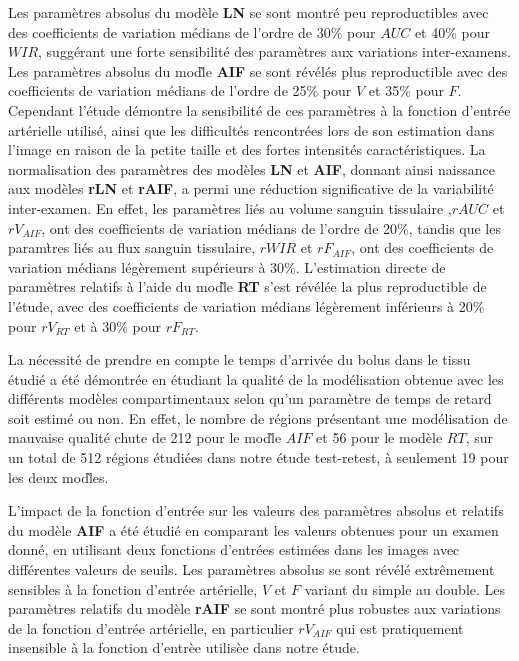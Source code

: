 \begin{otherlanguage}{francais}
Les param\`etres absolus du mod\`ele \textbf{LN} se sont montr\'e peu reproductibles avec des coefficients de variation m\'edians de l'ordre de 30\% pour $AUC$ et 40\% pour $WIR$, sugg\'erant une forte sensibilit\'e des param\`etres aux variations inter-examens.
Les param\`etres absolus du mod\`le \textbf{AIF} se sont r\'ev\'el\'es plus reproductible avec des coefficients de variation m\'edians de l'ordre de 25\% pour $V$ et 35\% pour $F$.
Cependant l'\'etude d\'emontre la sensibilit\'e de ces param\`etres \`a la fonction d'entr\'ee art\'erielle utilis\'e, ainsi que les difficult\'es rencontr\'ees lors de son estimation dans l'image en raison de la petite taille et des fortes intensit\'es caract\'eristiques.
La normalisation des param\`etres des mod\`eles \textbf{LN} et \textbf{AIF}, donnant ainsi naissance aux mod\`eles \textbf{rLN} et \textbf{rAIF}, a permi une r\'eduction significative de la variabilit\'e inter-examen.
En effet, les param\`etres li\'es au volume sanguin tissulaire ,$rAUC$ et $rV_{AIF}$, ont des coefficients de variation m\'edians de l'ordre de 20\%, tandis que les param\`tres li\'es au flux sanguin tissulaire, $rWIR$ et $rF_{AIF}$, ont des coefficients de variation m\'edians l\'eg\`erement sup\'erieurs \`a 30\%.
L'estimation directe de param\`etres relatifs \`a l'aide du mod\`le \textbf{RT} s'est r\'ev\'el\'ee la plus reproductible de l'\'etude, avec des coefficients de variation m\'edians l\'eg\`erement inf\'erieurs \`a 20\% pour $rV_{RT}$ et \`a 30\% pour $rF_{RT}$.

La n\'ecessit\'e de prendre en compte le temps d'arriv\'ee du bolus dans le tissu \'etudi\'e a \'et\'e d\'emontr\'ee en \'etudiant la qualit\'e de la mod\'elisation obtenue avec les diff\'erents mod\`eles compartimentaux selon qu'un param\`etre de temps de retard soit estim\'e ou non. 
En effet, le nombre de r\'egions pr\'esentant une mod\'elisation de mauvaise qualit\'e chute de 212 pour le mod\`le $AIF$ et 56 pour le mod\`ele $RT$, sur un total de 512 r\'egions \'etudi\'ees dans notre \'etude test-retest, \`a seulement 19 pour les deux mod\`les.

L'impact de la fonction d'entr\'ee sur les valeurs des param\`etres absolus et relatifs du mod\`ele \textbf{AIF} a \'et\'e \'etudi\'e en comparant les valeurs obtenues pour un examen donn\'e, en utilisant deux fonctions d'entr\'ees estim\'ees dans les images avec diff\'erentes valeurs de seuils.
Les param\`etres absolus se sont r\'ev\'el\'e extr\^emement sensibles \`a la fonction d'entr\'ee art\'erielle, $V$ et $F$ variant du simple au double.
Les param\`etres relatifs du mod\`ele \textbf{rAIF} se sont montr\'e plus robustes aux variations de la fonction d'entr\'ee art\'erielle, en particulier $rV_{AIF}$ qui est pratiquement insensible \`a la fonction d'entr\`ee utilis\`ee dans notre \'etude.


\end{otherlanguage}
